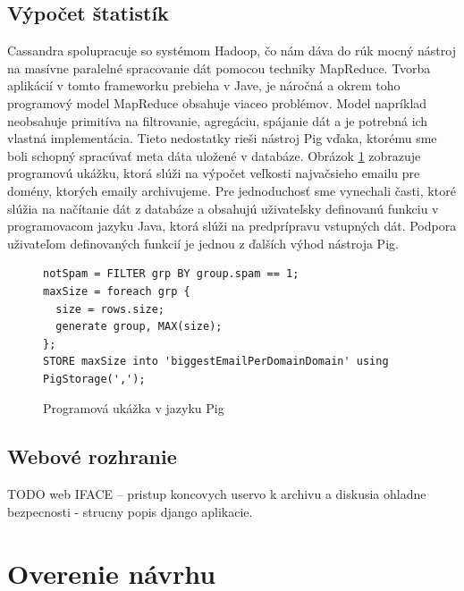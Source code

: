 \documentclass[11pt,twoside,a4paper]{book}
\begin{document}

\subsection{Výpočet štatistík}

Cassandra spolupracuje so systémom Hadoop, čo nám dáva do rúk mocný nástroj na masívne paralelné spracovanie dát pomocou techniky MapReduce. Tvorba aplikácií v tomto frameworku prebieha v Jave, je náročná a okrem toho programový model MapReduce obsahuje viaceo problémov. Model napríklad neobsahuje primitíva na filtrovanie, agregáciu, spájanie dát a je potrebná ich vlastná implementácia. Tieto nedostatky rieši nástroj Pig\cite{} vďaka, ktorému sme boli schopný spracúvať meta dáta uložené v databáze. Obrázok \ref{fig:PigExample} zobrazuje programovú ukážku, ktorá slúži na výpočet veľkosti najvačsieho emailu pre domény, ktorých emaily archivujeme. Pre jednoduchosť sme vynechali časti, ktoré slúžia na načítanie dát z databáze a obsahujú uživateľsky definovanú funkciu v programovacom jazyku Java, ktorá slúži na predprípravu vstupných dát. Podpora uživateľom definovaných funkcií je jednou z ďalších výhod nástroja Pig.

\begin{figure}[h]
\begin{verbatim}
notSpam = FILTER grp BY group.spam == 1;
maxSize = foreach grp {
  size = rows.size;
  generate group, MAX(size);
};
STORE maxSize into 'biggestEmailPerDomainDomain' using PigStorage(',');
\end{verbatim}
 \caption{Programová ukážka v jazyku Pig}
 \label{fig:PigExample}
\end{figure}  



\subsection{Webové rozhranie}
TODO
web IFACE -- pristup koncovych uservo k archivu a diskusia ohladne bezpecnosti - strucny popis django aplikacie.



\section{Overenie návrhu}
\end{document}
